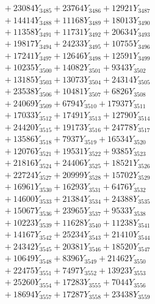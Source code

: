 \documentclass[a4paper,10pt]{article}
\begin{document}
{\begin{align}
&\;  + 23084 Y_{3485} + 23764 Y_{3486} + 12921 Y_{3487} \\[0.3ex]
&\;  + 14414 Y_{3488} + 11168 Y_{3489} + 18013 Y_{3490} \\[0.3ex]
&\;  + 11358 Y_{3491} + 11731 Y_{3492} + 20634 Y_{3493} \\[0.3ex]
&\;  + 19817 Y_{3494} + 24233 Y_{3495} + 10755 Y_{3496} \\[0.3ex]
&\;  + 17241 Y_{3497} + 12646 Y_{3498} + 12591 Y_{3499} \\[0.3ex]
&\;  + 10235 Y_{3500} + 14082 Y_{3501} + 9343 Y_{3502} \\[0.3ex]
&\;  + 13185 Y_{3503} + 13073 Y_{3504} + 24314 Y_{3505} \\[0.3ex]
&\;  + 23538 Y_{3506} + 10481 Y_{3507} + 6826 Y_{3508} \\[0.5ex]\allowbreak
&\;  + 24069 Y_{3509} + 6794 Y_{3510} + 17937 Y_{3511} \\[0.3ex]
&\;  + 17033 Y_{3512} + 17491 Y_{3513} + 12790 Y_{3514} \\[0.3ex]
&\;  + 24420 Y_{3515} + 19173 Y_{3516} + 24778 Y_{3517} \\[0.3ex]
&\;  + 13586 Y_{3518} + 7937 Y_{3519} + 16534 Y_{3520} \\[0.3ex]
&\;  + 12076 Y_{3521} + 19531 Y_{3522} + 9385 Y_{3523} \\[0.3ex]
&\;  + 21816 Y_{3524} + 24406 Y_{3525} + 18521 Y_{3526} \\[0.3ex]
&\;  + 22724 Y_{3527} + 20999 Y_{3528} + 15702 Y_{3529} \\[0.3ex]
&\;  + 16961 Y_{3530} + 16293 Y_{3531} + 6476 Y_{3532} \\[0.3ex]
&\;  + 14600 Y_{3533} + 21384 Y_{3534} + 24388 Y_{3535} \\[0.3ex]
&\;  + 15067 Y_{3536} + 23965 Y_{3537} + 9533 Y_{3538} \\[0.5ex]\allowbreak
&\;  + 10223 Y_{3539} + 11628 Y_{3540} + 11238 Y_{3541} \\[0.3ex]
&\;  + 14167 Y_{3542} + 25234 Y_{3543} + 21410 Y_{3544} \\[0.3ex]
&\;  + 24342 Y_{3545} + 20381 Y_{3546} + 18520 Y_{3547} \\[0.3ex]
&\;  + 10649 Y_{3548} + 8396 Y_{3549} + 21462 Y_{3550} \\[0.3ex]
&\;  + 22475 Y_{3551} + 7497 Y_{3552} + 13923 Y_{3553} \\[0.3ex]
&\;  + 25260 Y_{3554} + 17283 Y_{3555} + 7044 Y_{3556} \\[0.3ex]
&\;  + 18694 Y_{3557} + 17287 Y_{3558} + 23438 Y_{3559} \\[0.3ex]

\end{align}}
\end{document}
